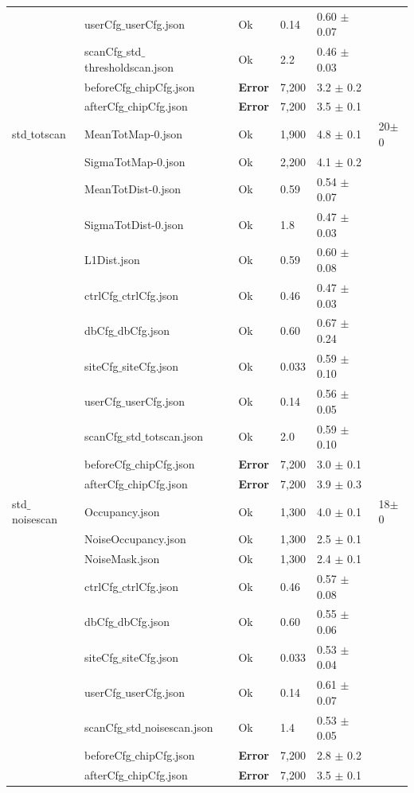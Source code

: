 \begin{longtable}{|llllll|}
 & userCfg$\_$userCfg.json & Ok & 0.14 & 0.60 $\pm$ 0.07 & \\
 & scanCfg$\_$std$\_$thresholdscan.json & Ok & 2.2 & 0.46 $\pm$ 0.03 & \\
 & beforeCfg$\_$chipCfg.json & { \bf Error} & 7,200 & 3.2 $\pm$ 0.2 & \\
 & afterCfg$\_$chipCfg.json & { \bf Error} & 7,200 & 3.5 $\pm$ 0.1 & \\
\hline
std$\_$totscan & MeanTotMap-0.json & Ok & 1,900 & 4.8 $\pm$ 0.1 & 20$\pm$0\\
 & SigmaTotMap-0.json & Ok & 2,200 & 4.1 $\pm$ 0.2 & \\
 & MeanTotDist-0.json & Ok & 0.59 & 0.54 $\pm$ 0.07 & \\
 & SigmaTotDist-0.json & Ok & 1.8 & 0.47 $\pm$ 0.03 & \\
 & L1Dist.json & Ok & 0.59 & 0.60 $\pm$ 0.08 & \\
 & ctrlCfg$\_$ctrlCfg.json & Ok & 0.46 & 0.47 $\pm$ 0.03 & \\
 & dbCfg$\_$dbCfg.json & Ok & 0.60 & 0.67 $\pm$ 0.24 & \\
 & siteCfg$\_$siteCfg.json & Ok & 0.033 & 0.59 $\pm$ 0.10 & \\
 & userCfg$\_$userCfg.json & Ok & 0.14 & 0.56 $\pm$ 0.05 & \\
 & scanCfg$\_$std$\_$totscan.json & Ok & 2.0 & 0.59 $\pm$ 0.10 & \\
 & beforeCfg$\_$chipCfg.json & { \bf Error} & 7,200 & 3.0 $\pm$ 0.1 & \\
 & afterCfg$\_$chipCfg.json & { \bf Error} & 7,200 & 3.9 $\pm$ 0.3 & \\
\hline
std$\_$noisescan & Occupancy.json & Ok & 1,300 & 4.0 $\pm$ 0.1 & 18$\pm$0\\
 & NoiseOccupancy.json & Ok & 1,300 & 2.5 $\pm$ 0.1 & \\
 & NoiseMask.json & Ok & 1,300 & 2.4 $\pm$ 0.1 & \\
 & ctrlCfg$\_$ctrlCfg.json & Ok & 0.46 & 0.57 $\pm$ 0.08 & \\
 & dbCfg$\_$dbCfg.json & Ok & 0.60 & 0.55 $\pm$ 0.06 & \\
 & siteCfg$\_$siteCfg.json & Ok & 0.033 & 0.53 $\pm$ 0.04 & \\
 & userCfg$\_$userCfg.json & Ok & 0.14 & 0.61 $\pm$ 0.07 & \\
 & scanCfg$\_$std$\_$noisescan.json & Ok & 1.4 & 0.53 $\pm$ 0.05 & \\
 & beforeCfg$\_$chipCfg.json & { \bf Error} & 7,200 & 2.8 $\pm$ 0.2 & \\
 & afterCfg$\_$chipCfg.json & { \bf Error} & 7,200 & 3.5 $\pm$ 0.1 & \\
\hline
\end{longtable}


